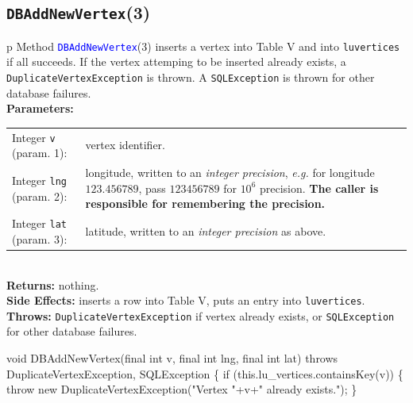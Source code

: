 \subsection{\texttt{DBAddNewVertex}(3)}
\begin{tabular}{p{\textwidth}}
\toprule
{}
Method \textcolor{blue}{{\tt{}\protect{}DBAddNewVertex}}(3) inserts a vertex into
Table V and into {\tt{}lu{}vertices} if all succeeds. If the vertex attemping
to be inserted already exists, a {\tt{}DuplicateVertexException} is thrown.
A {\tt{}SQLException} is thrown for other database failures.\\
\midrule
\textbf{Parameters:} \\
\begin{tabular}{lp{116mm}}
Integer {\tt{}v} (param. 1):&vertex identifier.\\
Integer {\tt{}lng} (param. 2):&longitude, written to an \emph{integer
precision}, \emph{e.g.} for longitude $123.456789$, pass $123456789$ for
$10^6$ precision. \textbf{The caller is responsible for remembering the
precision.}\\
Integer {\tt{}lat} (param. 3):&latitude, written to an \emph{integer
precision} as above.
\end{tabular}\\
\textbf{Returns:} nothing.\\
\textbf{Side Effects:} inserts a row into Table V, puts an entry into
{\tt{}lu{}vertices}.\\
\textbf{Throws:} {\tt{}DuplicateVertexException} if vertex already exists,
or {\tt{}SQLException} for other database failures.\\
\bottomrule
\end{tabular}
\nwenddocs{}\endmoddef{}
void DBAddNewVertex(final int v, final int lng, final int lat)
throws DuplicateVertexException, SQLException \{
\eatline
{}\nwendcode{}
\nwenddocs{}\plusendmoddef
  if (this.lu_vertices.containsKey(v)) \{
    throw new DuplicateVertexException("Vertex "+v+" already exists.");
  \}
\nwendcode{}

